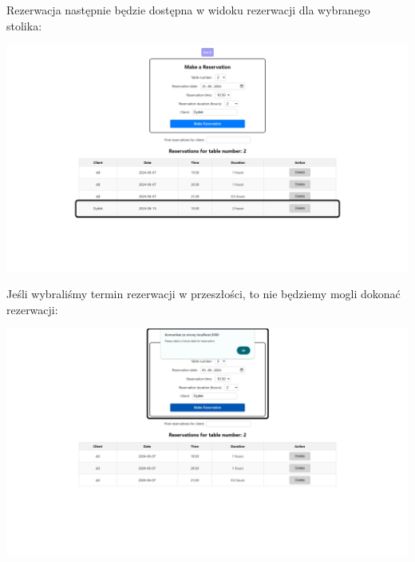 \documentclass[12pt]{article}
\begin{document}
\begin{minipage}{\textwidth}
\noindent Rezerwacja następnie będzie dostępna w widoku rezerwacji dla wybranego stolika:
\begin{center}
\includegraphics[width=\textwidth]{media/Reservations_addedReservation.png}
\end{center}
\end{minipage}

\begin{minipage}{\textwidth}
\noindent Jeśli wybraliśmy termin rezerwacji w przeszłości, to nie będziemy mogli dokonać rezerwacji:
\begin{center}
\includegraphics[width=\textwidth]{media/Reservations_previousDate.png}
\end{center}
\end{minipage}
\end{document}
